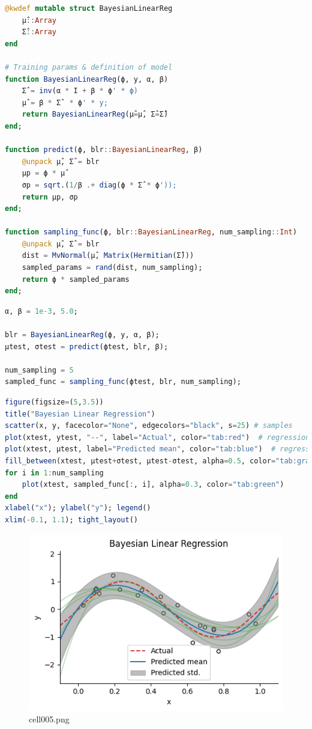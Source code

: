 \begin{lstlisting}[language=julia]
@kwdef mutable struct BayesianLinearReg
    μ̂::Array
    Σ̂::Array
end

# Training params & definition of model
function BayesianLinearReg(ϕ, y, α, β)
    Σ̂ = inv(α * I + β * ϕ' * ϕ)
    μ̂ = β * Σ̂  * ϕ' * y;
    return BayesianLinearReg(μ̂=μ̂, Σ̂=Σ̂)
end;

function predict(ϕ, blr::BayesianLinearReg, β)
    @unpack μ̂, Σ̂ = blr
    μp = ϕ * μ̂
    σp = sqrt.(1/β .+ diag(ϕ * Σ̂ * ϕ'));
    return μp, σp
end;

function sampling_func(ϕ, blr::BayesianLinearReg, num_sampling::Int)
    @unpack μ̂, Σ̂ = blr
    dist = MvNormal(μ̂, Matrix(Hermitian(Σ̂)))
    sampled_params = rand(dist, num_sampling);
    return ϕ * sampled_params 
end;
\end{lstlisting}
\begin{lstlisting}[language=julia]
α, β = 1e-3, 5.0;

blr = BayesianLinearReg(ϕ, y, α, β);
μtest, σtest = predict(ϕtest, blr, β);

num_sampling = 5
sampled_func = sampling_func(ϕtest, blr, num_sampling);
\end{lstlisting}
\begin{lstlisting}[language=julia]
figure(figsize=(5,3.5))
title("Bayesian Linear Regression")
scatter(x, y, facecolor="None", edgecolors="black", s=25) # samples
plot(xtest, ytest, "--", label="Actual", color="tab:red")  # regression line
plot(xtest, μtest, label="Predicted mean", color="tab:blue")  # regression line
fill_between(xtest, μtest+σtest, μtest-σtest, alpha=0.5, color="tab:gray", label="Predicted std.")
for i in 1:num_sampling
    plot(xtest, sampled_func[:, i], alpha=0.3, color="tab:green")
end
xlabel("x"); ylabel("y"); legend()
xlim(-0.1, 1.1); tight_layout()
\end{lstlisting}
\begin{figure}[ht]
	\centering
	\includegraphics[scale=0.8, max width=\linewidth]{./fig/bayesian-brain/bayesian-linear-regression/cell005.png}
	\caption{cell005.png}
	\label{cell005.png}
\end{figure}
